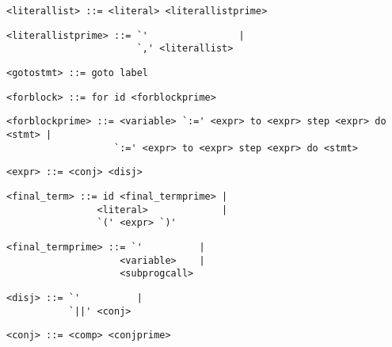 \begin{footnotesize}
\begin{lstlisting}[frame=single, label={literallist}, language=pie]
<literallist> ::= <literal> <literallistprime>
\end{lstlisting}

\begin{lstlisting}[frame=single, label={literallistprime}, language=pie]
<literallistprime> ::= `'                |
                       `,' <literallist>
\end{lstlisting}

\begin{lstlisting}[frame=single, label={gotostmt}, language=pie]
<gotostmt> ::= goto label
\end{lstlisting}

\begin{lstlisting}[frame=single, label={forblock}, language=pie]
<forblock> ::= for id <forblockprime>
\end{lstlisting}

\begin{lstlisting}[frame=single, label={forblockprime}, language=pie]
<forblockprime> ::= <variable> `:=' <expr> to <expr> step <expr> do <stmt> |
                   `:=' <expr> to <expr> step <expr> do <stmt>
\end{lstlisting}

\begin{lstlisting}[frame=single, label={expr}, language=pie]
<expr> ::= <conj> <disj>
\end{lstlisting}

\begin{lstlisting}[frame=single, label={final_term}, language=pie]
<final_term> ::= id <final_termprime> |
                <literal>             |
                `(' <expr> `)'
\end{lstlisting}

\begin{lstlisting}[frame=single, label={final_termprime}, language=pie]
<final_termprime> ::= `'          |
                    <variable>    |
                    <subprogcall>
\end{lstlisting}

\begin{lstlisting}[frame=single, label={disj}, language=pie]
<disj> ::= `'          |
           `||' <conj>
\end{lstlisting}

\begin{lstlisting}[frame=single, label={conj}, language=pie]
<conj> ::= <comp> <conjprime>
\end{lstlisting}


\end{footnotesize}
